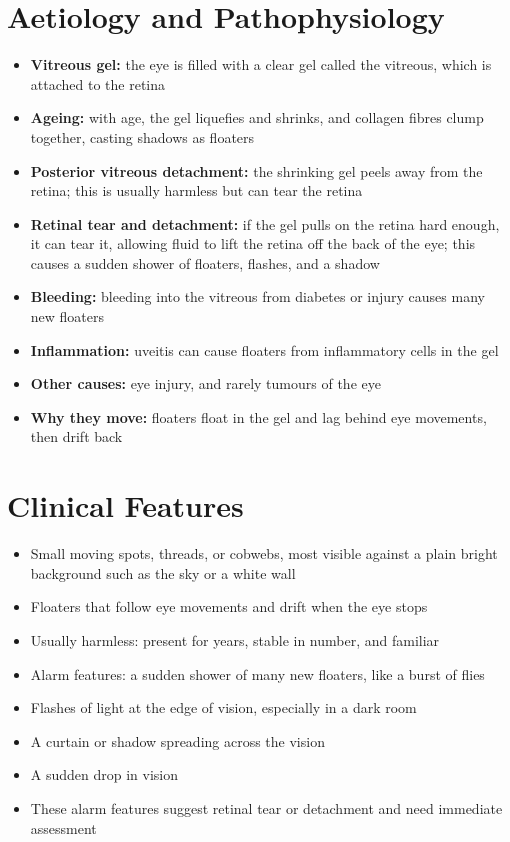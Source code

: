 \section*{Aetiology and Pathophysiology}
\begin{itemize}
    \item \textbf{Vitreous gel:} the eye is filled with a clear gel called the vitreous, which is attached to the retina
    \item \textbf{Ageing:} with age, the gel liquefies and shrinks, and collagen fibres clump together, casting shadows as floaters
    \item \textbf{Posterior vitreous detachment:} the shrinking gel peels away from the retina; this is usually harmless but can tear the retina
    \item \textbf{Retinal tear and detachment:} if the gel pulls on the retina hard enough, it can tear it, allowing fluid to lift the retina off the back of the eye; this causes a sudden shower of floaters, flashes, and a shadow
    \item \textbf{Bleeding:} bleeding into the vitreous from diabetes or injury causes many new floaters
    \item \textbf{Inflammation:} uveitis can cause floaters from inflammatory cells in the gel
    \item \textbf{Other causes:} eye injury, and rarely tumours of the eye
    \item \textbf{Why they move:} floaters float in the gel and lag behind eye movements, then drift back
\end{itemize}

\section*{Clinical Features}
\begin{itemize}
    \item Small moving spots, threads, or cobwebs, most visible against a plain bright background such as the sky or a white wall
    \item Floaters that follow eye movements and drift when the eye stops
    \item Usually harmless: present for years, stable in number, and familiar
    \item Alarm features: a sudden shower of many new floaters, like a burst of flies
    \item Flashes of light at the edge of vision, especially in a dark room
    \item A curtain or shadow spreading across the vision
    \item A sudden drop in vision
    \item These alarm features suggest retinal tear or detachment and need immediate assessment
\end{itemize}

